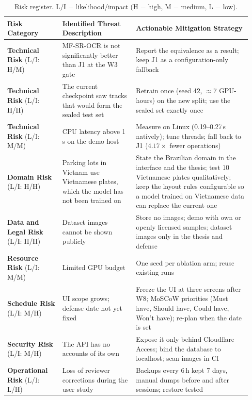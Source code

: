 \begin{table}[tbp]
\centering
\caption{Risk register. L/I = likelihood/impact (H = high, M = medium, L = low).}
\label{tab:risks}
\begin{tabularx}{\textwidth}{@{}P{22mm} L L@{}}
\toprule
Risk Category & Identified Threat Description & Actionable Mitigation Strategy \\
\midrule
\textbf{Technical Risk} (L/I: H/M) & MF-SR-OCR is not significantly better than J1 at the W3 gate & Report the equivalence as a result; keep J1 as a configuration-only fallback \\
\textbf{Technical Risk} (L/I: H/H) & The current checkpoint saw tracks that would form the sealed test set & Retrain once (seed 42, $\approx$7 GPU-hours) on the new split; use the sealed set exactly once \\
\textbf{Technical Risk} (L/I: M/M) & CPU latency above 1\,s on the demo host & Measure on Linux (0.19--0.27\,s natively); tune threads; fall back to J1 ($4.17\times$ fewer operations) \\
\textbf{Domain Risk} (L/I: H/H) & Parking lots in Vietnam use Vietnamese plates, which the model has not been trained on & State the Brazilian domain in the interface and the thesis; test 10 Vietnamese plates qualitatively; keep the layout rules configurable so a model trained on Vietnamese data can replace the current one \\
\textbf{Data and Legal Risk} (L/I: H/H) & Dataset images cannot be shown publicly & Store no images; demo with own or openly licensed samples; dataset images only in the thesis and defense \\
\textbf{Resource Risk} (L/I: M/M) & Limited GPU budget & One seed per ablation arm; reuse existing runs \\
\textbf{Schedule Risk} (L/I: M/H) & UI scope grows; defense date not yet fixed & Freeze the UI at three screens after W8; MoSCoW priorities (Must have, Should have, Could have, Won't have); re-plan when the date is set \\
\textbf{Security Risk} (L/I: M/H) & The API has no accounts of its own & Expose it only behind Cloudflare Access; bind the database to localhost; scan images in CI \\
\textbf{Operational Risk} (L/I: L/H) & Loss of reviewer corrections during the user study & Backups every 6\,h kept 7 days, manual dumps before and after sessions; restore tested \\
\bottomrule
\end{tabularx}
\end{table}
